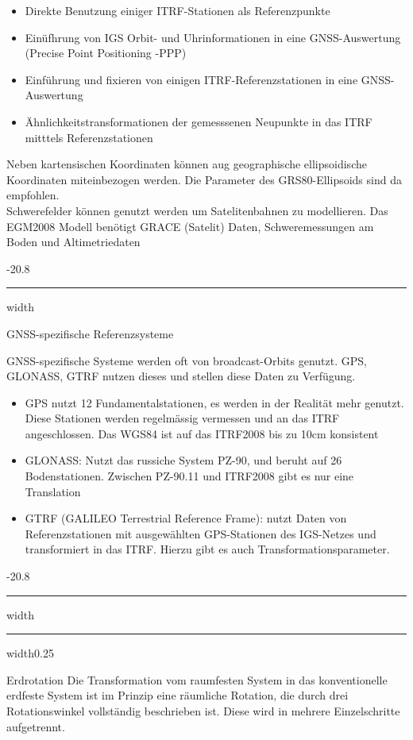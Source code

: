 \documentclass[9pt, landscape, fleqn]{scrartcl}
\makeatletter
\renewcommand{\subsection}{\@startsection{subsection}{1}{0mm}%
{-2\baselineskip}{0.8\baselineskip}%
{\hrule depth 0.2pt width\columnwidth\hrule depth0.75pt
width0.25\columnwidth\vspace*{1.2em}\large\bfseries\rmfamily}}
\renewcommand{\subsubsection}{\@startsection{subsubsection}{1}{0mm}%
{-2\baselineskip}{0.8\baselineskip}%
{\hrule depth 0.2pt width\columnwidth\vspace*{1.2em}\normalsize\bfseries\rmfamily}}
\makeatother
\begin{document}
\begin{multicols*}{3}
\begin{itemize}
    \item Direkte Benutzung einiger ITRF-Stationen als Referenzpunkte
    \item Einüfhrung von IGS Orbit- und Uhrinformationen in eine GNSS-Auswertung (Precise Point Positioning -PPP)
    \item Einführung und fixieren von einigen ITRF-Referenzstationen in eine GNSS-Auswertung
    \item Ähnlichkeitstransformationen der gemesssenen Neupunkte in das ITRF mitttels Referenzstationen
\end{itemize}

Neben kartensischen Koordinaten können aug geographische ellipsoidische Koordinaten miteinbezogen werden. Die Parameter des GRS80-Ellipsoids sind da empfohlen. \\ 

Schwerefelder können genutzt werden um Satelitenbahnen zu modellieren. Das EGM2008 Modell benötigt GRACE (Satelit) Daten, Schweremessungen am Boden und Altimetriedaten

\subsubsection{GNSS-spezifische Referenzsysteme}

GNSS-spezifische Systeme werden oft von broadcast-Orbits genutzt. GPS, GLONASS, GTRF nutzen dieses und stellen diese Daten zu Verfügung. 

\begin{itemize}
    \item GPS nutzt 12 Fundamentalstationen, es werden in der Realität mehr genutzt. Diese Stationen werden regelmässig vermessen und an das ITRF angeschlossen. Das WGS84 ist auf das ITRF2008 bis zu 10cm konsistent
    \item GLONASS: Nutzt das russiche System PZ-90, und beruht auf 26 Bodenstationen. Zwischen PZ-90.11 und ITRF2008 gibt es nur eine Translation
    \item GTRF (GALILEO Terrestrial Reference Frame): nutzt Daten von Referenzstationen mit ausgewählten GPS-Stationen des IGS-Netzes und transformiert in das ITRF. Hierzu gibt es auch Transformationsparameter.
\end{itemize}

\subsection{Erdrotation}
Die Transformation vom raumfesten System in das konventionelle erdfeste System ist im Prinzip eine räumliche Rotation, die durch drei Rotationswinkel vollständig beschrieben ist. Diese wird in mehrere Einzelschritte aufgetrennt.

\end{multicols*}
\end{document}
